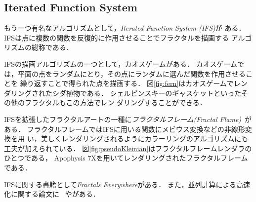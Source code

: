 \subsection{Iterated Function System}

もう一つ有名なアルゴリズムとして，\textit{Iterated Function System (IFS)}が
ある．IFSは点に複数の関数を反復的に作用させることでフラクタルを描画する
アルゴリズムの総称である．

IFSの描画アルゴリズムの一つとして，カオスゲームがある．
カオスゲームでは，平面の点をランダムにとり，その点にランダムに選んだ関数を作用させることを
繰り返すことで得られた点を描画する．
図\ref{fig:fern}はカオスゲームでレンダリングされたシダ植物である．
シェルピンスキーのギャスケットといったその他のフラクタルもこの方法でレン
ダリングすることができる．

IFSを拡張したフラクタルアートの一種に\emph{フラクタルフレーム}\textit{(Fractal
Flame)}~\cite{draves2003fractal}がある．
フラクタルフレームではIFSに用いる関数にメビウス変換などの非線形変換を用
い，美しくレンダリングされるようにカラーリングのアルゴリズムにも工夫が加えられている．
図\ref{fig:pseudoKleinian}はフラクタルフレームレンダラのひとつである，
Apophysis 7Xを用いてレンダリングされたフラクタルフレームである．

IFSに関する書籍として\textit{Fractals
Everywhere}\cite{BarnsleyMathematics201207}がある．
また，並列計算による高速化に関する論文に
~\cite{2010_fractal_flames}や\cite{Green:2005:GIF:1187112.1187128}がある．

